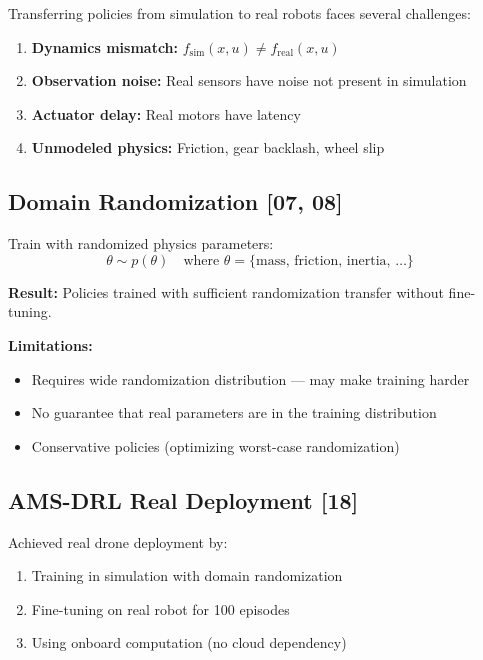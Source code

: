 \documentclass[11pt,a4paper]{report}
\begin{document}
Transferring policies from simulation to real robots faces several challenges:
\begin{enumerate}
    \item \textbf{Dynamics mismatch:} $f_{\text{sim}}(x,u) \neq f_{\text{real}}(x,u)$
    \item \textbf{Observation noise:} Real sensors have noise not present in simulation
    \item \textbf{Actuator delay:} Real motors have latency
    \item \textbf{Unmodeled physics:} Friction, gear backlash, wheel slip
\end{enumerate}

\subsection{Domain Randomization [07, 08]}

Train with randomized physics parameters:
\begin{equation}
    \theta \sim p(\theta) \quad \text{where } \theta = \{\text{mass, friction, inertia, \ldots}\}
\end{equation}

\textbf{Result:} Policies trained with sufficient randomization transfer without fine-tuning.

\textbf{Limitations:}
\begin{itemize}
    \item Requires wide randomization distribution --- may make training harder
    \item No guarantee that real parameters are in the training distribution
    \item Conservative policies (optimizing worst-case randomization)
\end{itemize}

\subsection{AMS-DRL Real Deployment [18]}

Achieved real drone deployment by:
\begin{enumerate}
    \item Training in simulation with domain randomization
    \item Fine-tuning on real robot for 100 episodes
    \item Using onboard computation (no cloud dependency)
\end{enumerate}
\end{document}
